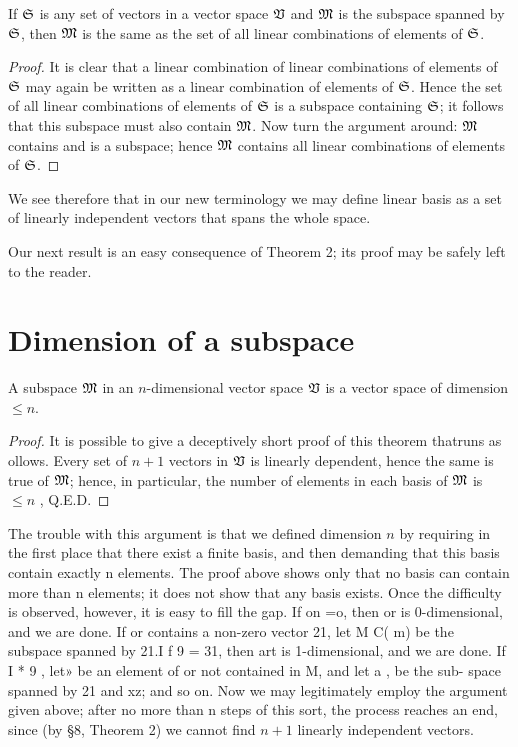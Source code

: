 \begin{theorem}
    If \(\frak{S}\) is any set of vectors in a vector space \(\mathfrak{V}\) and
    \(\mathfrak{M}\) is the subspace spanned by \(\frak{S}\), then \(\mathfrak{M}\) is the
    same as the set of all linear combinations of elements of \(\frak{S}\).
\end{theorem}

\begin{proof}
    It is clear that a linear combination of linear combinations of elements of
    \(\frak{S}\) may again be written as a linear combination of elements of
    \(\frak{S}\). Hence the set of all linear combinations of elements of
    \(\frak{S}\) is a subspace containing \(\frak{S}\); it follows that this
    subspace must also contain \(\mathfrak{M}\). Now turn the argument around:
    \(\mathfrak{M}\) contains and is a subspace; hence \(\mathfrak{M}\) contains all linear
    combinations of elements of \(\frak{S}\).
\end{proof}

We see therefore that in our new terminology we may define linear basis as a set of linearly independent vectors that spans the whole space.

Our next result is an easy consequence of Theorem 2; its proof may be
safely left to the reader.



\section{Dimension of a subspace}

\begin{theorem}
    A subspace \(\mathfrak{M}\) in an \(n\)-dimensional vector space \(\mathfrak{V}\) is a
    vector space of dimension \(\leq n\).
\end{theorem}

\begin{proof}
    It is possible to give a deceptively short proof of this theorem thatruns as
    ollows. Every set of \(n + 1\) vectors in \(\mathfrak{V}\) is linearly dependent,
    hence the same is true of \(\mathfrak{M}\); hence, in particular, the number of
    elements in each basis of \(\mathfrak{M}\) is \(\leq n\) , Q.E.D.
\end{proof}

The trouble with this argument is that we defined dimension \(n\) by
requiring in the first place that there exist a finite basis, and then demanding that this basis contain exactly n elements. The proof above shows only that no basis can contain more than n elements; it does not show that any basis exists. Once the difficulty is observed, however, it is easy to fill the gap. If on =o, then or is 0-dimensional, and we are done. If or contains a non-zero vector 21, let M C( m) be the subspace spanned by 21.I f 9 = 31, then art is 1-dimensional, and we are done. If I * 9 , let» be an element of or not contained in M, and let a , be the sub- space spanned by 21 and xz; and so on. Now we may legitimately employ the argument given above; after no more than n steps of this sort, the process reaches an end, since (by §8, Theorem 2) we cannot find \(n + 1\) linearly independent vectors.

